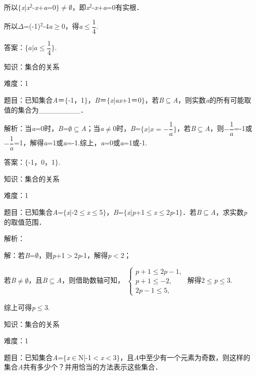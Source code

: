 \documentclass{article} %
\begin{document}
所以$\mathrm{\{}$\textit{x}|\textit{x}${}^{2}$-\textit{x}+\textit{a}=0$\mathrm{\}}$$\mathrm{\neq}$$\mathrm{\emptyset}$，即\textit{x}${}^{2}$-\textit{x}+\textit{a}=0有实根．

所以$\Delta$=(-1)${}^{2}$-4\textit{a}$\mathrm{\ge}$0，得\textit{a}$\mathrm{\le}\dfrac{1}{4}$.

答案：$\mathrm{\{} \textit{a}|\textit{a}\mathrm{\le}\dfrac{1}{4}    \mathrm{\}}$.

知识：集合的关系

难度：1

题目：已知集合\textit{A}＝$\mathrm{\{}$-1，1$\mathrm{\}}$，\textit{B}＝$\mathrm{\{}$\textit{x}|\textit{ax}+1＝0$\mathrm{\}}$，若\textit{B}$\mathrm{\subseteq}$\textit{A}，则实数\textit{a}的所有可能取值的集合为\_\_\_\_\_\_\_\_．

解析：当\textit{a}=0时，\textit{B}=$\mathrm{\emptyset}$$\mathrm{\subseteq}$\textit{A}；当\textit{a}$\mathrm{\neq}$0时，\textit{B}=$\mathrm{\{} \textit{x}|\textit{x}=-\dfrac{1}{a} \mathrm{\}}$，若\textit{B}$\mathrm{\subseteq}$\textit{A}，则$-\dfrac{1}{a}$=-1或$-\dfrac{1}{a}$=1，解得\textit{a}=1或\textit{a}=-1.综上，\textit{a}=0或\textit{a}=1或-1.

答案：$\mathrm{\{}$-1，0，1$\mathrm{\}}$.

知识：集合的关系

难度：1

题目：已知集合\textit{A}=$\mathrm{\{}$\textit{x}|-2$\mathrm{\le}$\textit{x}$\mathrm{\le}$5$\mathrm{\}}$，\textit{B}=$\mathrm{\{}$\textit{x}|\textit{p}+1$\mathrm{\le}$\textit{x}$\mathrm{\le}$2\textit{p}-1$\mathrm{\}}$．若\textit{B}$\mathrm{\subseteq}$\textit{A}，求实数\textit{p}的取值范围．

解析：

解：若\textit{B}=$\mathrm{\emptyset}$，则\textit{p}+1$\mathrm{>}$2\textit{p}-1，解得\textit{p}$\mathrm{<}$2；

若\textit{B}$\mathrm{\neq}$$\mathrm{\emptyset}$，且\textit{B}$\mathrm{\subseteq}$\textit{A}，则借助数轴可知，
$\left\{
\begin{array}{l}
p+1\le2p-1,\\
p+1\leq-2,\\
2p-1\le5,
\end{array}
\right.$
解得2$\mathrm{\le}$\textit{p}$\mathrm{\le}$3.

综上可得\textit{p}$\mathrm{\le}$3.

知识：集合的关系

难度：1

题目：已知集合\textit{A}=$\mathrm{\{}$\textit{x}$\mathrm{\in}$N|-1$\mathrm{<}$\textit{x}$\mathrm{<}$3$\mathrm{\}}$，且\textit{A}中至少有一个元素为奇数，则这样的集合\textit{A}共有多少个？并用恰当的方法表示这些集合．
\end{document}
